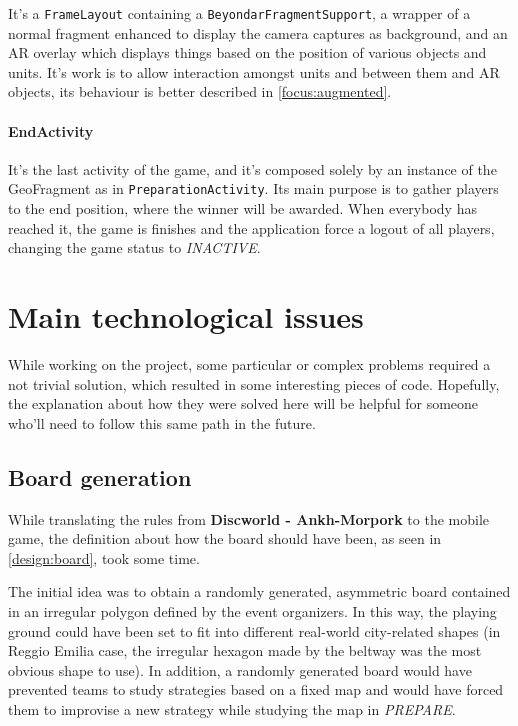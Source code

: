 		It's a \lstinline|FrameLayout| containing a \lstinline|BeyondarFragmentSupport|, a wrapper of a normal fragment enhanced to display the camera captures as background, and an AR overlay which displays things based on the position of various objects and units.
		It's work is to allow interaction amongst units and between them and AR objects, its behaviour is better described in \autoref{focus:augmented}.
		
		\paragraph{EndActivity}
	
		It's the last activity of the game, and it's composed solely by an instance of the GeoFragment as in \lstinline|PreparationActivity|.
		Its main purpose is to gather players to the end position, where the winner will be awarded. When everybody has reached it, the game is finishes and the application force a logout of all players, changing the game status to \emph{INACTIVE}.
	
	\section{Main technological issues}
		
		While working on the project, some particular or complex problems required a not trivial solution, which resulted in some interesting pieces of code.
		Hopefully, the explanation about how they were solved here will be helpful for someone who'll need to follow this same path in the future.
		
		\subsection{Board generation}\label{focus:board}
		
			While translating the rules from \textbf{Discworld - Ankh-Morpork} to the mobile game, the definition about how the board should have been, as seen in \autoref{design:board}, took some time.
			
			The initial idea was to obtain a randomly generated, asymmetric board contained in an irregular polygon defined by the event organizers.
			In this way, the playing ground could have been set to fit into different real-world city-related shapes (in Reggio Emilia case, the irregular hexagon made by the beltway was the most obvious shape to use).
			In addition, a randomly generated board would have prevented teams to study strategies based on a fixed map and would have forced them to improvise a new strategy while studying the map in \emph{PREPARE}.
			
